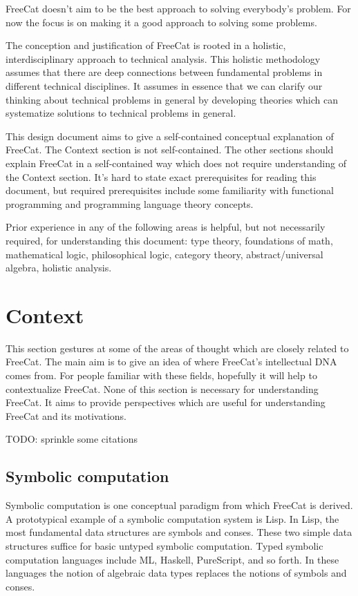 \documentclass{article}
\begin{document}
FreeCat doesn't aim to be the best approach to solving everybody's problem. For now the focus is on making it a good approach to solving some problems.

The conception and justification of FreeCat is rooted in a holistic, interdisciplinary approach to technical analysis. This holistic methodology assumes that there are deep connections between fundamental problems in different technical disciplines. It assumes in essence that we can clarify our thinking about technical problems in general by developing theories which can systematize solutions to technical problems in general.

This design document aims to give a self-contained conceptual explanation of FreeCat. The Context section is not self-contained. The other sections should explain FreeCat in a self-contained way which does not require understanding of the Context section. It's hard to state exact prerequisites for reading this document, but required prerequisites include some familiarity with functional programming and programming language theory concepts.

Prior experience in any of the following areas is helpful, but not necessarily required, for understanding this document: type theory, foundations of math, mathematical logic, philosophical logic, category theory, abstract/universal algebra, holistic analysis.

\section{Context}

This section gestures at some of the areas of thought which are closely related to FreeCat. The main aim is to give an idea of where FreeCat's intellectual DNA comes from. For people familiar with these fields, hopefully it will help to contextualize FreeCat. None of this section is necessary for understanding FreeCat. It aims to provide perspectives which are useful for understanding FreeCat and its motivations.

TODO: sprinkle some citations

\subsection{Symbolic computation}

Symbolic computation is one conceptual paradigm from which FreeCat is derived. A prototypical example of a symbolic computation system is Lisp. In Lisp, the most fundamental data structures are symbols and conses. These two simple data structures suffice for basic untyped symbolic computation. Typed symbolic computation languages include ML, Haskell, PureScript, and so forth. In these languages the notion of algebraic data types replaces the notions of symbols and conses.
\end{document}
